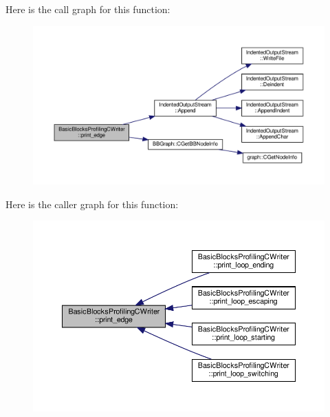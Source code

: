 Here is the call graph for this function\+:
\nopagebreak
\begin{figure}[H]
\begin{center}
\leavevmode
\includegraphics[width=350pt]{d1/d9c/classBasicBlocksProfilingCWriter_a2efe4603c6a9adb508091feb50cabf5f_cgraph}
\end{center}
\end{figure}
Here is the caller graph for this function\+:
\nopagebreak
\begin{figure}[H]
\begin{center}
\leavevmode
\includegraphics[width=350pt]{d1/d9c/classBasicBlocksProfilingCWriter_a2efe4603c6a9adb508091feb50cabf5f_icgraph}
\end{center}
\end{figure}
\mbox{\label{classBasicBlocksProfilingCWriter_aa45c57894aba6cedaff580f45cab879b}} 
